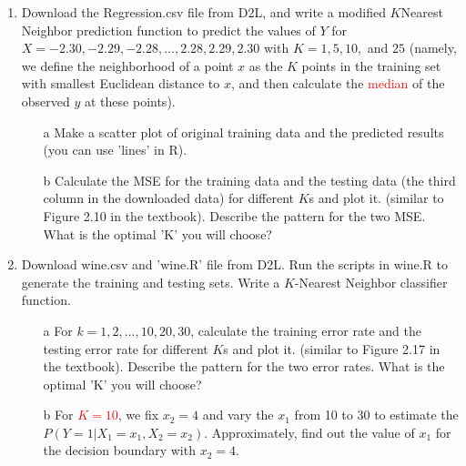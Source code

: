 \documentclass[11pt]{article}
\begin{document}
\begin{enumerate}
	\item Download the Regression.csv file from D2L, and write a modified $K$Nearest Neighbor prediction function to predict the values of $Y$ 
	for $X = -2.30, -2.29, -2.28, \ldots, 2.28, 2.29, 2.30$ with
	 $ K = 1, 5, 10,$ and $25$ (namely, we define the neighborhood of a point $x$ as the $K$ points in the training set with smallest Euclidean distance to $x$, and then calculate the \textcolor{red}{median} of the observed $y$ at these points).
\begin{itemize}
	\item[a] Make a scatter plot of original training data and the predicted results (you can use 'lines' in R). 
    \item[b] Calculate the MSE for the training data and the testing data (the third column in the downloaded data) for different $K$s and plot it. (similar to Figure 2.10 in the textbook). Describe the pattern for the two MSE. What is the optimal 'K' you will choose?
\end{itemize}	
 \item Download wine.csv and 'wine.R' file from D2L. Run the scripts in wine.R to generate the training and testing sets. Write a $K$-Nearest Neighbor classifier function. 
   \begin{itemize}
   \item[a]  For $k = 1, 2,\ldots, 10, 20, 30$, calculate the training error rate and the testing error rate for different $K$s and plot it. (similar to Figure 2.17 in the textbook). Describe the pattern for the two error rates. What is the optimal 'K' you will choose?
   \item[b] For \textcolor{red}{$K = 10$}, we fix $x_2 = 4$ and vary the  $x_1$ from 10 to  30 to estimate the $P(Y = 1 | X_1 = x_1, X_2 = x_2)$.  Approximately, find out the value of $x_1$ for the decision boundary with $x_2 = 4$. 
\end{itemize}    

\end{enumerate}
\end{document}
